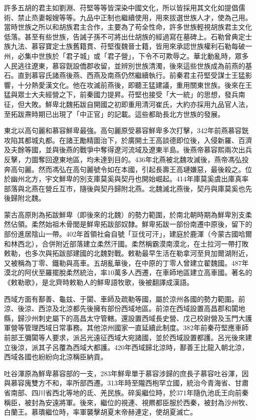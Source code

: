 許多五胡的君主如劉淵、苻堅等等皆深染中國文化，所以皆採用其文化如提倡儒術、禁止烝妻報嫂等等。九品中正制也繼續使用，用來拔選世族人才，使為己用。當時世族之所以和胡族君主合作，主要為了苟全性命，許多世族輕視胡族君主文化低落。甚至有些世族，告誡子孫不可將出仕胡族的經過寫在墓碑上。石勒曾典定士族九法、慕容寶定士族舊籍貫、苻堅復魏晉士籍，皆用來承認世族權利石勒每破一州，必集中世族於「君子城」或「君子營」，下令不可欺辱之。華北動亂時，眾多人民逃往遼東，慕容皝設僑郡收留，並辨別世族清濁，後來這些世族成為前燕的基石。直到慕容氏諸燕後燕、西燕及南燕仍然繼續執行。前秦君主苻堅受謀士王猛影響，十分熱愛漢文化。他在攻滅前燕後，即聽王猛建議，重用關東世族。後來在王猛與眾士大夫經營之下，前秦國力提昇。苻堅也接受「大一統」的思想，發兵南征，但大敗。鮮卑北魏拓跋自開國之初即重用清河崔氏，大約亦採用九品官人法，至拓跋燾時期已出現了「中正官」的記載。這些都助長北方世族的發展。

東北以高句麗和慕容鮮卑最強。高句麗原受慕容鮮卑多次打擊，342年前燕慕容皝攻陷其都城丸都。在諸王勵精圖治下，於廣開土王高談德即位後，入侵新羅、百濟及夫餘等國，並與後燕的戰爭中奪得遼河流域及遼東半島。後燕帝慕容熙兩次出兵反擊，力圖奪回遼東地區，均未達到目的。436年北燕被北魏攻滅後，燕帝馮弘投奔高句麗。然而馮弘在高句麗號令如在本國，引起長壽王高璉嫌惡，最後殺之。位於幽州北方，宇文鮮卑的別支庫莫奚與契丹也開始崛起。414年庫莫奚虞出庫真率部落與北燕在營丘互市，隨後與契丹歸附北燕。北魏滅北燕後，契丹與庫莫奚也先後歸附北魏。

蒙古高原則為拓跋鮮卑（即後來的北魏）的勢力範圍，於南北朝時期為鮮卑別支柔然佔領。柔然始祖木骨閭是鮮卑拓跋部奴隸。鮮卑拓跋一部份南遷中原後，留下的部份進居陰山一帶。402年首領社侖自號「豆伐可汗」，建庭於鹿渾（今蒙古國哈爾和林西北），合併附近部落建立柔然汗國。柔然稱霸漠南漠北，在土拉河一帶打敗敕勒，也多次與拓跋部建國的北魏對戰。敕勒最早生活在勒拿河至貝加爾湖附近，又被稱為丁零、鐵勒與高車。五胡亂華後，在中原的丁零人曾建立翟魏國。487年漠北的阿伏至羅擺脫柔然統治，率10萬多人西遷，在車師地區建立高車國。著名的《敕勒歌》，是北齊時敕勒人的鮮卑語牧歌，後被翻譯成漢語。

西域方面有鄯善、龜兹、于闐、車師及疏勒等國，屬於涼州各國的勢力範圍。前涼、後涼、西涼及北涼都先後擁有部份西域地區。前涼在西域設置高昌郡和闐地縣，歸沙州刺史屬下的高昌太守管轄。還設置西域長史營、戊己校尉營及玉門大護軍營等管理西域日常事務。其他涼州國家一直延續此制度。382年前秦苻堅應車師前部王彌闐等人要求，派呂光遠征西域大宛諸國，並於西域設置都護。呂光後來建立後涼，派其子呂覆為西域大都護。420年西域歸北涼時，鄯善王比龍入朝北涼，西域各國也紛紛向北涼稱臣納貢。

吐谷渾原為鮮卑慕容部的一支，283年鮮卑單于慕容涉歸的庶長子慕容吐谷渾，因與慕容廆雙方不和，率所部西遷。313年時至隴西枹罕立國，統治今青海省、甘肅省南部、四川省西北等地的氐、羌民族。碎奚繼位時，於371年隨仇池氐王向前秦稱臣，被封為安遠將軍。後來，繼位的視連、視羆都臣服於西秦，被封為沙州牧、白蘭王。慕璝繼位時，率軍襲擊胡夏末帝赫連定，使胡夏滅亡。

